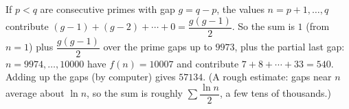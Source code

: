 If $p<q$ are consecutive primes with gap $g=q-p$, the values $n=p+1,\dots,q$ contribute $(g-1)+(g-2)+\cdots+0=\dfrac{g(g-1)}2$. So the sum is $1$ (from $n=1$) plus $\dfrac{g(g-1)}2$ over the prime gaps up to $9973$, plus the partial last gap: $n=9974,\dots,10000$ have $f(n)=10007$ and contribute $7+8+\cdots+33=540$. Adding up the gaps (by computer) gives $\boxed{57134}$. (A rough estimate: gaps near $n$ average about $\ln n$, so the sum is roughly $\sum\dfrac{\ln n}2$, a few tens of thousands.)
